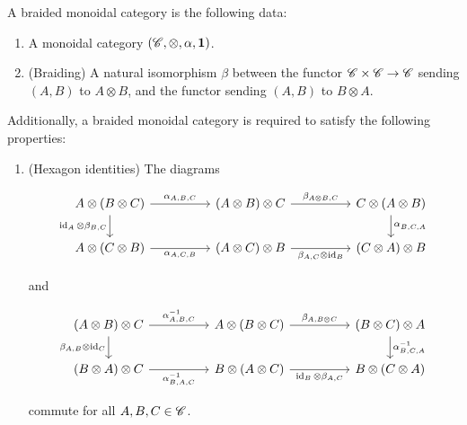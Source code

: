 \begin{definition} A braided monoidal category is the following data:

\begin{enumerate}
\item A monoidal category $(\mathscr{C},\otimes,\alpha, \mathbf{1})$.
\item (Braiding) A natural isomorphism $\beta$ between the functor $\mathscr{C}\times \mathscr{C}\to \mathscr{C}$ sending $(A,B)$ to $A\otimes B$, and the functor sending $(A,B)$ to $B\otimes A$.
\end{enumerate}

Additionally, a braided monoidal category is required to satisfy the following properties:

\begin{enumerate}
\item (Hexagon identities) The diagrams

\[\begin{tikzcd}
	{A\otimes (B\otimes C)} && {(A\otimes B)\otimes C} && {C\otimes (A\otimes B)} \\
	{A\otimes (C\otimes B)} && {(A\otimes C)\otimes B} && {(C\otimes A)\otimes B}
	\arrow["{\alpha_{A,B,C}}", from=1-1, to=1-3]
	\arrow["{\beta_{A\otimes B,C}}", from=1-3, to=1-5]
	\arrow["{\alpha^{}_{B,C,A}}", from=1-5, to=2-5]
	\arrow["{\id_A\otimes \beta_{B,C}}"', from=1-1, to=2-1]
	\arrow["{\alpha_{A,C,B}}"', from=2-1, to=2-3]
	\arrow["{\beta_{A,C}\otimes \id_B}"', from=2-3, to=2-5]
\end{tikzcd}\]

and

\[\begin{tikzcd}
	{(A\otimes B)\otimes C} && {A\otimes (B\otimes C)} && {(B\otimes C)\otimes A} \\
	{(B\otimes A)\otimes C} && {B\otimes (A\otimes C)} && {B\otimes (C\otimes A)}
	\arrow["{\alpha^{-1}_{A,B,C}}", from=1-1, to=1-3]
	\arrow["{\beta_{A,B\otimes C}}", from=1-3, to=1-5]
	\arrow["{\alpha^{-1}_{B,C,A}}", from=1-5, to=2-5]
	\arrow["{\beta_{A,B}\otimes \id_C}"', from=1-1, to=2-1]
	\arrow["{\alpha^{-1}_{B,A,C}}"', from=2-1, to=2-3]
	\arrow["{\id_B\otimes \beta_{A,C}}"', from=2-3, to=2-5]
\end{tikzcd}\]

commute for all $A,B,C\in \mathscr{C}$.
\end{enumerate}

\raggedleft\qedsymbol{}
\end{definition}

